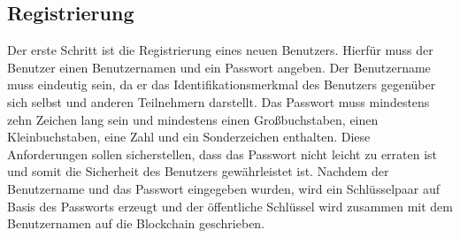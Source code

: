 \subsection{Registrierung}



Der erste Schritt ist die Registrierung eines neuen Benutzers. Hierfür muss der Benutzer einen Benutzernamen
und ein Passwort angeben. Der Benutzername muss eindeutig sein, da er das Identifikationsmerkmal 
des Benutzers gegenüber sich selbst und anderen Teilnehmern darstellt.
Das Passwort muss mindestens zehn Zeichen lang sein und mindestens einen Großbuchstaben, einen Kleinbuchstaben,
eine Zahl und ein Sonderzeichen enthalten. Diese Anforderungen sollen sicherstellen, dass das Passwort
nicht leicht zu erraten ist und somit die Sicherheit des Benutzers gewährleistet ist.
Nachdem der Benutzername und das Passwort eingegeben wurden, wird ein Schlüsselpaar auf 
Basis des Passworts erzeugt und der öffentliche Schlüssel wird zusammen mit dem
Benutzernamen auf die Blockchain geschrieben.


